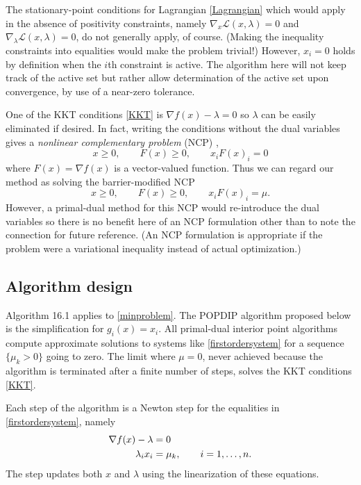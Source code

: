 \documentclass[11pt]{article}
\newcommand{\grad}{\nabla}
\begin{document}
The stationary-point conditions for Lagrangian \eqref{Lagrangian} which would apply in the absence of positivity constraints, namely $\grad_x\mathcal{L}(x,\lambda)=0$ and $\grad_\lambda\mathcal{L}(x,\lambda)=0$, do not generally apply, of course.  (Making the inequality constraints into equalities would make the problem trivial!)  However, $x_i=0$ holds by definition when the $i$th constraint is active.  The algorithm here will not keep track of the active set but rather allow determination of the active set upon convergence, by use of a near-zero tolerance.

One of the KKT conditions \eqref{KKT} is $\grad f(x)-\lambda=0$ so $\lambda$ can be easily eliminated if desired.  In fact, writing the conditions without the dual variables gives a \emph{nonlinear complementary problem} (NCP) \cite{FacchineiPang2007},
    $$x \ge 0, \qquad F(x) \ge 0, \qquad x_i F(x)_i = 0$$
where $F(x) = \grad f(x)$ is a vector-valued function.  Thus we can regard our method as solving the barrier-modified NCP
    $$x \ge 0, \qquad F(x) \ge 0, \qquad x_i F(x)_i = \mu.$$
However, a primal-dual method for this NCP would re-introduce the dual variables so there is no benefit here of an NCP formulation other than to note the connection for future reference.  (An NCP formulation is appropriate if the problem were a variational inequality \cite{BensonMunson2006,Bueler2016} instead of actual optimization.)


\subsection*{Algorithm design}

Algorithm 16.1 \cite{GrivaNashSofer2009} applies to \eqref{minproblem}.  The POPDIP algorithm proposed below is the simplification for $g_i(x)=x_i$.  All primal-dual interior point algorithms compute approximate solutions to systems like \eqref{firstordersystem} for a sequence $\{\mu_k>0\}$ going to zero.  The limit where $\mu=0$, never achieved because the algorithm is terminated after a finite number of steps, solves the KKT conditions \eqref{KKT}.

Each step of the algorithm is a Newton step for the equalities in \eqref{firstordersystem}, namely
\begin{align}
\grad f(x) - \lambda &= 0 \label{equalitysystem} \\
\lambda_i x_i &= \mu_k, \qquad i=1,\dots,n. \notag
\end{align}
The step updates both $x$ and $\lambda$ using the linearization of these equations.
\end{document}
